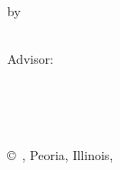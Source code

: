 \pagestyle{empty}

\begin{titlepage}
        \begin{center}
        \vspace*{1.0cm}

        \Huge
        {\bf \thesistitlecoverpage }

        \vspace*{1.0cm}

        \normalsize
        by \\

        \vspace*{1.0cm}

        \Large
        \thesisauthor\\
        Advisor:~\advisor\\

        \vspace*{3.0cm}


        \vspace*{2.0cm}

        \nameofprogram\\
        \academicunit\\
        \nameOfUniversity\\

        \vspace*{4.0cm}

        \copyright~\thesisauthor, Peoria, Illinois, \graduationyear\\
        \end{center}
\end{titlepage}


\pagestyle{plain}
\setcounter{page}{2}

\cleardoublepage %



